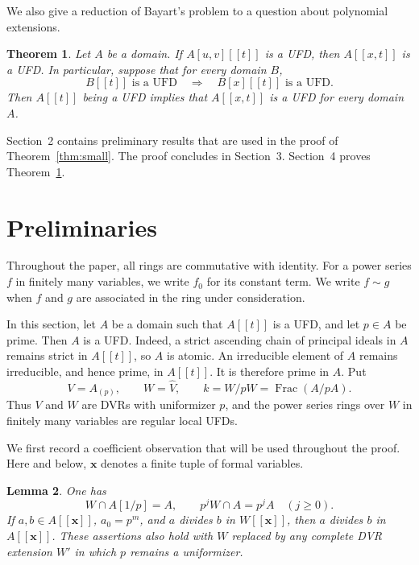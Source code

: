 \documentclass[11pt]{amsart}
\newtheorem{theorem}{Theorem}[section]
\newtheorem{lemma}[theorem]{Lemma}
\theoremstyle{remark}
\DeclareMathOperator{\Frac}{Frac}
\newcommand{\xx}{\boldsymbol{x}}
\begin{document}
We also give a reduction of Bayart's problem to a question about
polynomial extensions.

\begin{theorem}\label{thm:reduction}
Let $A$ be a domain. If $A[u,v][[t]]$ is a UFD, then
$A[[x,t]]$ is a UFD. In particular, suppose that for every domain $B$,
\begin{equation}\label{eq:pep}
 B[[t]]\text{ is a UFD}\quad\Longrightarrow\quad
 B[x][[t]]\text{ is a UFD}.
\end{equation}
Then $A[[t]]$ being a UFD implies that $A[[x,t]]$ is a UFD for
every domain $A$.
\end{theorem}

Section~2 contains preliminary results that are used in
the proof of Theorem~\ref{thm:small}. The proof concludes in
Section~3. Section~4 proves Theorem~\ref{thm:reduction}.


\section{Preliminaries}
\label{sec:prelim}


Throughout the paper, all rings are commutative with identity.
For a power series $f$ in finitely many variables, we write $f_0$
for its constant term. We write $f\sim g$ when $f$ and $g$ are
associated in the ring under consideration.

In this section, let $A$ be a domain such that $A[[t]]$ is a UFD,
and let $p\in A$ be prime. Then $A$ is a UFD. Indeed, a strict
ascending chain of principal ideals in $A$ remains strict in
$A[[t]]$, so $A$ is atomic. An irreducible element of $A$ remains
irreducible, and hence prime, in $A[[t]]$. It is therefore prime
in $A$. Put
\[
 V=A_{(p)},\qquad W=\widehat V,\qquad k=W/pW=\Frac(A/pA).
\]
Thus $V$ and $W$ are DVRs with uniformizer $p$, and the power series
rings over $W$ in finitely many variables are regular local UFDs.

We first record a coefficient observation that will be used
throughout the proof. Here and below, $\xx$ denotes a finite tuple
of formal variables.

\begin{lemma}\label{lem:division}
One has
\[
 W\cap A[1/p]=A,\qquad p^jW\cap A=p^jA\quad(j\geq0).
\]
If $a,b\in A[[\xx]]$, $a_0=p^m$, and $a$ divides $b$ in
$W[[\xx]]$, then $a$ divides $b$ in $A[[\xx]]$.
These assertions also hold with $W$ replaced by any complete DVR
extension $W'$ in which $p$ remains a uniformizer.
\end{lemma}
\end{document}
